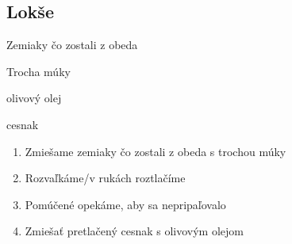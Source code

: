 \setcounter{step}{0}
\subsection{Lokše}

\begin{ingredient}
\def\portions{4}%

\begin{main}
	\item Zemiaky čo zostali z obeda
	\item Trocha múky
	\item olivový olej
	\item cesnak
\end{main}
\end{ingredient}
\begin{recipe}

\begin{enumerate}


\item{Zmiešame zemiaky čo zostali z obeda s trochou múky}
\item{Rozvaľkáme/v rukách roztlačíme}
\item{Pomúčené opekáme, aby sa nepripaľovalo}	
\item{Zmiešať pretlačený cesnak s olivovým olejom}

\end{enumerate}
\end{recipe}

\begin{notes}

\end{notes}
\clearpage	
